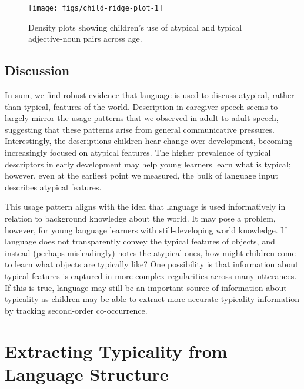 \documentclass{ucetd}
\begin{document}
\begin{figure}[tb]

{\centering \texttt{[image: figs/child-ridge-plot-1]} 

}

\caption{Density plots showing children's use of atypical and typical adjective-noun pairs across age.}\label{fig:child-ridge-plot}
\end{figure}

\hypertarget{discussion}{%
\subsection{Discussion}\label{discussion}}

In sum, we find robust evidence that language is used to discuss
atypical, rather than typical, features of the world. Description in
caregiver speech seems to largely mirror the usage patterns that we
observed in adult-to-adult speech, suggesting that these patterns arise
from general communicative pressures. Interestingly, the descriptions
children hear change over development, becoming increasingly focused on
atypical features. The higher prevalence of typical descriptors in early
development may help young learners learn what is typical; however, even
at the earliest point we measured, the bulk of language input describes
atypical features.

This usage pattern aligns with the idea that language is used
informatively in relation to background knowledge about the world. It
may pose a problem, however, for young language learners with
still-developing world knowledge. If language does not transparently
convey the typical features of objects, and instead (perhaps
misleadingly) notes the atypical ones, how might children come to learn
what objects are typically like? One possibility is that information
about typical features is captured in more complex regularities across
many utterances. If this is true, language may still be an important
source of information about typicality as children may be able to
extract more accurate typicality information by tracking second-order
co-occurrence.

\hypertarget{extracting-typicality-from-language-structure}{%
\section{Extracting Typicality from Language
Structure}\label{extracting-typicality-from-language-structure}}
\end{document}
